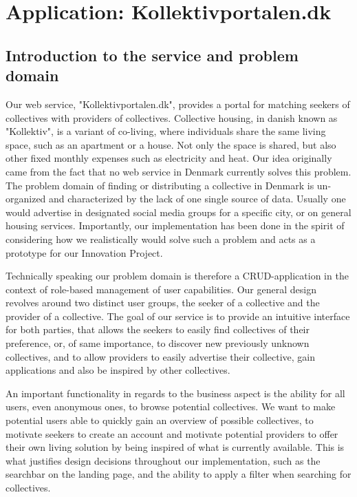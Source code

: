 \section{Application: Kollektivportalen.dk}

\subsection{Introduction to the service and problem domain}
Our web service, "Kollektivportalen.dk", provides a portal for matching seekers of collectives with providers of collectives. 
Collective housing, in danish known as "Kollektiv", is a variant of co-living, where individuals share the same living space, such as an apartment or a house. 
Not only the space is shared, but also other fixed monthly expenses such as electricity and heat.
Our idea originally came from the fact that no web service in Denmark currently solves this problem. The problem domain of finding or distributing a collective in Denmark is un-organized and characterized by the lack of one single source of data. Usually one would advertise in designated social media groups for a specific city, or on general housing services. 
Importantly, our implementation has been done in the spirit of considering how we realistically would solve such a problem and acts as a prototype for our Innovation Project.

Technically speaking our problem domain is therefore a CRUD-application in the context of role-based management of user capabilities.
Our general design revolves around two distinct user groups, the seeker of a collective and the provider of a collective. The goal of our service is to provide an intuitive interface for both parties, that allows the seekers to easily find collectives of their preference, or, of same importance, to discover new previously unknown collectives, and to allow providers to easily advertise their collective, gain applications and also be inspired by other collectives.

An important functionality in regards to the business aspect is the ability for all users, even anonymous ones, to browse potential collectives. 
We want to make potential users able to quickly gain an overview of possible collectives, to motivate seekers to create an account and motivate potential providers to offer their own living solution by being inspired of what is currently available. 
This is what justifies design decisions throughout our implementation, such as the searchbar on the landing page, and the ability to apply a filter when searching for collectives.

